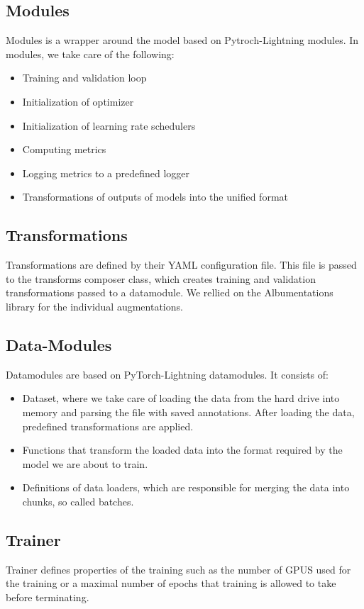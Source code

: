 \subsection{Modules}
Modules is a wrapper around the model based on Pytroch-Lightning modules. In modules, we take care of the following:
\begin{itemize}
    \item Training and validation loop
    \item Initialization of optimizer
    \item Initialization of learning rate schedulers
    \item Computing metrics
    \item Logging metrics to a predefined logger
    \item Transformations of outputs of models into the unified format
\end{itemize}


\subsection{Transformations}
Transformations are defined by their YAML configuration file. This file is passed to the transforms composer class, which creates training and validation transformations passed to a datamodule. We rellied on the Albumentations library for the individual augmentations.

\subsection{Data-Modules}
Datamodules are based on PyTorch-Lightning datamodules. It consists of:
\begin{itemize}
    \item Dataset, where we take care of loading the data from the hard drive into memory and parsing the file with saved annotations. After loading the data, predefined transformations are applied.
    \item Functions that transform the loaded data into the format required by the model we are about to train.
    \item Definitions of data loaders, which are responsible for merging the data into chunks, so called batches.
\end{itemize}
\subsection{Trainer}
Trainer defines properties of the training such as the number of GPUS used for the training or a maximal number of epochs that training is allowed to take before terminating.

